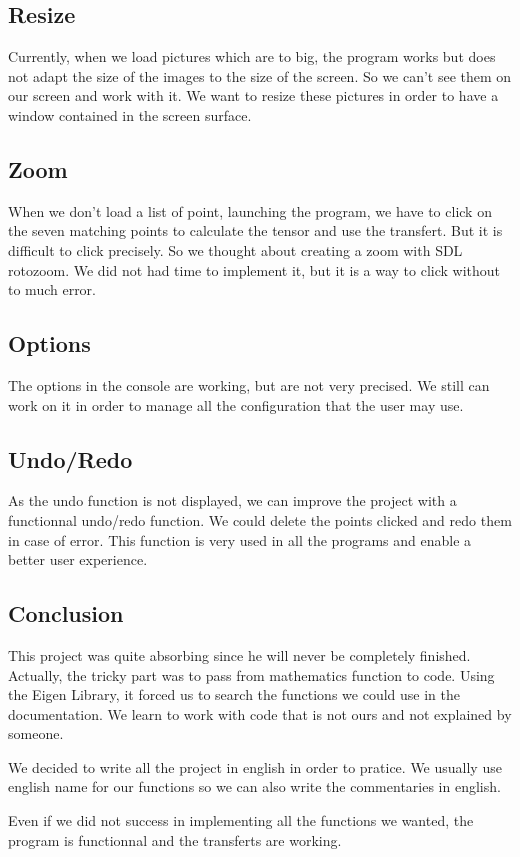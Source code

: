 \documentclass{report}
\begin{document}
\textcolor{subtitle}{\subsection{Resize }}
Currently, when we load pictures which are to big, the program works but does not adapt the size of the images to the size of the screen. So we can't see them on our screen and work with it. 
We want to resize these pictures in order to have a window contained in the screen surface. 

\textcolor{subtitle}{\subsection{Zoom}}
When we don't load a list of point, launching the program, we have to click on the seven matching points to calculate the tensor and use the transfert. But it is difficult to click precisely. So we thought about creating a zoom with SDL rotozoom. We did not had time to implement it, but it is a way to click without to much error.

\textcolor{subtitle}{\subsection{Options}}
The options in the console are working, but are not very precised. We still can work on it in order to manage all the configuration that the user may use. 

\textcolor{subtitle}{\subsection{Undo/Redo}}
As the undo function is not displayed, we can improve the project with a functionnal undo/redo function. We could delete the points clicked and redo them in case of error. This function is very used in all the programs and enable a better user experience. 

\newpage
\textcolor{title}{\section*{Conclusion}}
This project was quite absorbing since he will never be completely finished. Actually, the tricky part was to pass from mathematics function to code. Using the Eigen Library, it forced us to search the functions we could use in the documentation. We learn to work with code that is not ours and not explained by someone. 



We decided to write all the project in english in order to pratice. We usually use english name for our functions so we can also write the commentaries in english. 

Even if we did not success in implementing all the functions we wanted, the program is functionnal and the transferts are working. 
\end{document}
